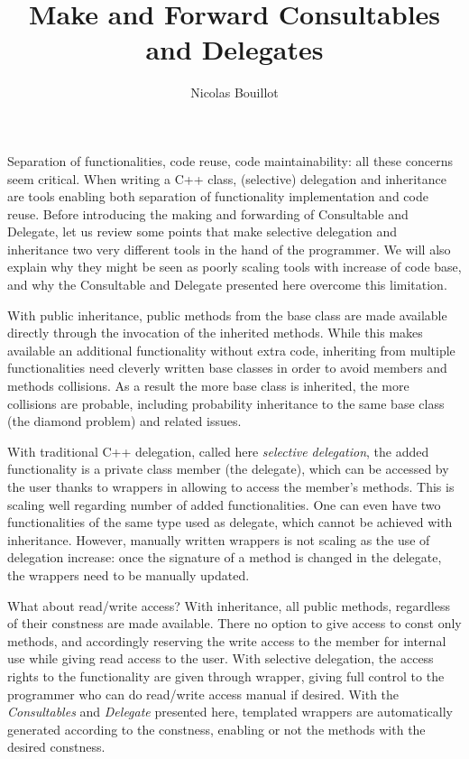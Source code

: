 \documentclass{article}
\begin{document}
\title{Make and Forward Consultables and Delegates}
\author{Nicolas Bouillot}
\maketitle

Separation of functionalities, code reuse, code maintainability: all these concerns seem critical. When writing a C++ class, (selective) delegation and inheritance are tools enabling both separation of functionality implementation and code reuse. Before introducing the making and forwarding of Consultable and Delegate, let us review some points that make selective delegation and inheritance two very different tools in the hand of the programmer. We will also explain why they might be seen as poorly scaling tools with increase of code base, and why the Consultable and Delegate presented here overcome this limitation.

With public inheritance, public methods from the base class are made available directly through the invocation of the inherited methods. While this makes available an additional functionality without extra code, inheriting from multiple functionalities need cleverly written base classes in order to avoid members and methods collisions. As a result the more base class is inherited, the more collisions are probable, including probability inheritance to the same base class (the diamond problem) and related issues.

With traditional C++ delegation, called here \textit{selective delegation}, the added functionality is a private class member (the delegate), which can be accessed by the user thanks to wrappers in allowing to access the member's methods. This is scaling well regarding number of added functionalities. One can even have two functionalities of the same type used as delegate, which cannot be achieved with inheritance. However, manually written wrappers is not scaling as the use of delegation increase: once the signature of a method is changed in the delegate, the wrappers need to be manually updated.  
 
What about read/write access? With inheritance, all public methods, regardless of their constness are made available. There no option to give access to const only methods, and accordingly reserving the write access to the member for internal use while giving read access to the user. With selective delegation, the access rights to the functionality are given through wrapper, giving full control to the programmer who can do read/write access manual if desired. With the \textit{Consultables} and \textit{Delegate} presented here, templated wrappers are automatically generated according to the constness, enabling or not the methods with the desired constness. 
\end{document}
